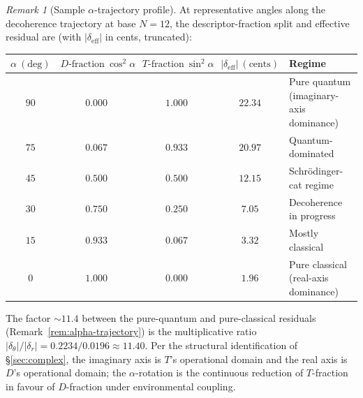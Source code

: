 \documentclass[11pt,a4paper]{article}
\theoremstyle{definition}
\theoremstyle{remark}
\newtheorem{remark}[theorem]{Remark}
\begin{document}
\begin{remark}[Sample $\alpha$-trajectory profile]\label{rem:alpha-profile}
At representative angles along the decoherence trajectory at base $N=12$, the descriptor-fraction split and effective residual are (with $|\delta_{\mathrm{eff}}|$ in cents, truncated):
\begin{center}
\begin{tabularx}{\textwidth}{c|c|c|c|X}
$\alpha~(\text{deg})$ & $D\text{-fraction}~\cos^{2}\alpha$ & $T\text{-fraction}~\sin^{2}\alpha$ & $|\delta_{\mathrm{eff}}|~(\text{cents})$ & Regime \\ \hline
$90$ & $0.000$ & $1.000$ & $22.34$ & Pure quantum (imaginary-axis dominance) \\
$75$ & $0.067$ & $0.933$ & $20.97$ & Quantum-dominated \\
$45$ & $0.500$ & $0.500$ & $12.15$ & Schr\"odinger-cat regime \\
$30$ & $0.750$ & $0.250$ & $7.05$ & Decoherence in progress \\
$15$ & $0.933$ & $0.067$ & $3.32$ & Mostly classical \\
$0$ & $1.000$ & $0.000$ & $1.96$ & Pure classical (real-axis dominance)
\end{tabularx}
\end{center}
The factor $\sim 11.4$ between the pure-quantum and pure-classical residuals (Remark~\ref{rem:alpha-trajectory}) is the multiplicative ratio $|\delta_{\theta}|/|\delta_{r}| = 0.2234/0.0196 \approx 11.40$. Per the structural identification of \S\ref{sec:complex}, the imaginary axis is $T$'s operational domain and the real axis is $D$'s operational domain; the $\alpha$-rotation is the continuous reduction of $T$-fraction in favour of $D$-fraction under environmental coupling.
\end{remark}
\end{document}
